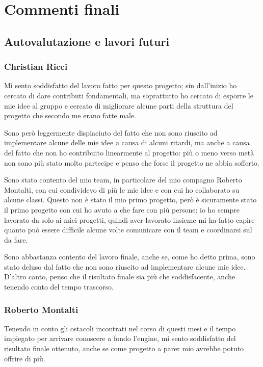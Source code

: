 \chapter{Commenti finali}

\section{Autovalutazione e lavori futuri}

\subsection{Christian Ricci}

Mi sento soddisfatto del lavoro fatto per questo progetto; sin dall'inizio ho cercato di dare contributi fondamentali, ma soprattutto ho cercato di esporre le mie idee al gruppo e cercato di migliorare alcune parti della struttura del progetto che secondo me erano fatte male.

Sono però leggermente dispiaciuto del fatto che non sono riuscito ad implementare alcune delle mie idee a causa di alcuni ritardi, ma anche a causa del fatto che non ho contribuito linearmente al progetto: più o meno verso metà non sono più stato molto partecipe e penso che forse il progetto ne abbia sofferto.

Sono stato contento del mio team, in particolare del mio compagno Roberto Montalti, con cui condividevo di più le mie idee e con cui ho collaborato su alcune classi. Questo non è stato il mio primo progetto, però è sicuramente stato il primo progetto con cui ho avuto a che fare con più persone: io ho sempre lavorato da solo ai miei progetti, quindi aver lavorato insieme mi ha fatto capire quanto può essere difficile alcune volte comunicare con il team e coordinarsi sul da fare.

Sono abbastanza contento del lavoro finale, anche se, come ho detto prima, sono stato deluso dal fatto che non sono riuscito ad implementare alcune mie idee. D'altro canto, penso che il risultato finale sia più che soddisfacente, anche tenendo conto del tempo trascorso.

\subsection{Roberto Montalti}

Tenendo in conto gli ostacoli incontrati nel corso di questi mesi e il tempo impiegato per arrivare conoscere a fondo l'engine, mi sento soddisfatto del risultato finale ottenuto, anche se come progetto a parer mio avrebbe potuto offrire di più.

